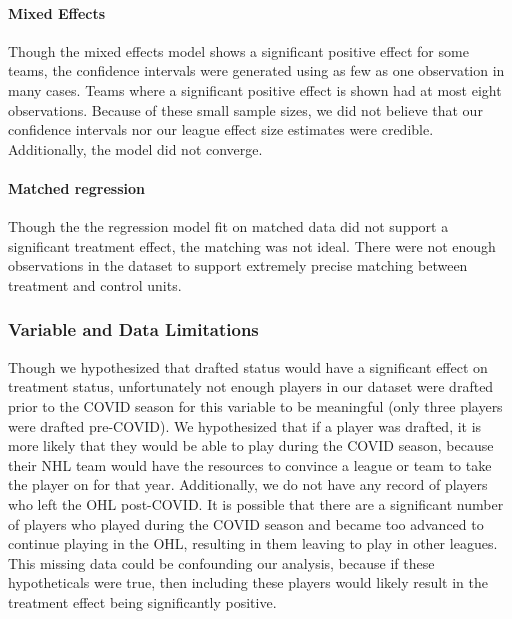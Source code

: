\documentclass[12pt]{article}
\begin{document}
\hypertarget{mixed-effects}{%
\paragraph{Mixed Effects}\label{mixed-effects}}

Though the mixed effects model shows a significant positive effect for
some teams, the confidence intervals were generated using as few as one
observation in many cases. Teams where a significant positive effect is
shown had at most eight observations. Because of these small sample
sizes, we did not believe that our confidence intervals nor our league
effect size estimates were credible. Additionally, the model did not
converge.

\hypertarget{matched-regression}{%
\paragraph{Matched regression}\label{matched-regression}}

Though the the regression model fit on matched data did not support a
significant treatment effect, the matching was not ideal. There were not
enough observations in the dataset to support extremely precise matching
between treatment and control units.

\hypertarget{variable-and-data-limitations}{%
\subsubsection{Variable and Data
Limitations}\label{variable-and-data-limitations}}

Though we hypothesized that drafted status would have a significant
effect on treatment status, unfortunately not enough players in our
dataset were drafted prior to the COVID season for this variable to be
meaningful (only three players were drafted pre-COVID). We hypothesized
that if a player was drafted, it is more likely that they would be able
to play during the COVID season, because their NHL team would have the
resources to convince a league or team to take the player on for that
year. Additionally, we do not have any record of players who left the
OHL post-COVID. It is possible that there are a significant number of
players who played during the COVID season and became too advanced to
continue playing in the OHL, resulting in them leaving to play in other
leagues. This missing data could be confounding our analysis, because if
these hypotheticals were true, then including these players would likely
result in the treatment effect being significantly positive.
\end{document}
